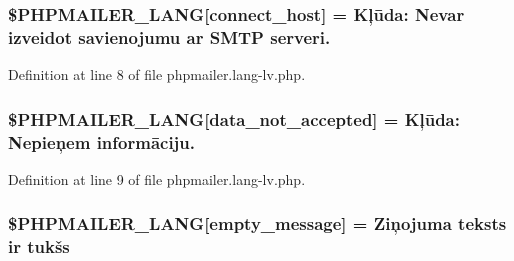 \subsubsection[{\texorpdfstring{\$\+P\+H\+P\+M\+A\+I\+L\+E\+R\+\_\+\+L\+A\+NG}{$PHPMAILER_LANG}}]{\setlength{\rightskip}{0pt plus 5cm}\$P\+H\+P\+M\+A\+I\+L\+E\+R\+\_\+\+L\+A\+NG\mbox{[}\textquotesingle{}connect\+\_\+host\textquotesingle{}\mbox{]} =  Kļūda\+: Nevar izveidot savienojumu ar {\bf S\+M\+TP} serveri.\textquotesingle{}}\hypertarget{phpmailer_8lang-lv_8php_a2ee0cc637a06b96e45600db31c6799ee}{}\label{phpmailer_8lang-lv_8php_a2ee0cc637a06b96e45600db31c6799ee}


Definition at line 8 of file phpmailer.\+lang-\/lv.\+php.

\subsubsection[{\texorpdfstring{\$\+P\+H\+P\+M\+A\+I\+L\+E\+R\+\_\+\+L\+A\+NG}{$PHPMAILER_LANG}}]{\setlength{\rightskip}{0pt plus 5cm}\$P\+H\+P\+M\+A\+I\+L\+E\+R\+\_\+\+L\+A\+NG\mbox{[}\textquotesingle{}data\+\_\+not\+\_\+accepted\textquotesingle{}\mbox{]} =  Kļūda\+: Nepieņem informāciju.\textquotesingle{}}\hypertarget{phpmailer_8lang-lv_8php_a814c6b191205d2361b3233e9c9d6fda5}{}\label{phpmailer_8lang-lv_8php_a814c6b191205d2361b3233e9c9d6fda5}


Definition at line 9 of file phpmailer.\+lang-\/lv.\+php.

\subsubsection[{\texorpdfstring{\$\+P\+H\+P\+M\+A\+I\+L\+E\+R\+\_\+\+L\+A\+NG}{$PHPMAILER_LANG}}]{\setlength{\rightskip}{0pt plus 5cm}\$P\+H\+P\+M\+A\+I\+L\+E\+R\+\_\+\+L\+A\+NG\mbox{[}\textquotesingle{}empty\+\_\+message\textquotesingle{}\mbox{]} = \textquotesingle{}Ziņojuma teksts ir tukšs\textquotesingle{}}\hypertarget{phpmailer_8lang-lv_8php_a33772099f637c9d6c2cd7425e0e37fed}{}\label{phpmailer_8lang-lv_8php_a33772099f637c9d6c2cd7425e0e37fed}



